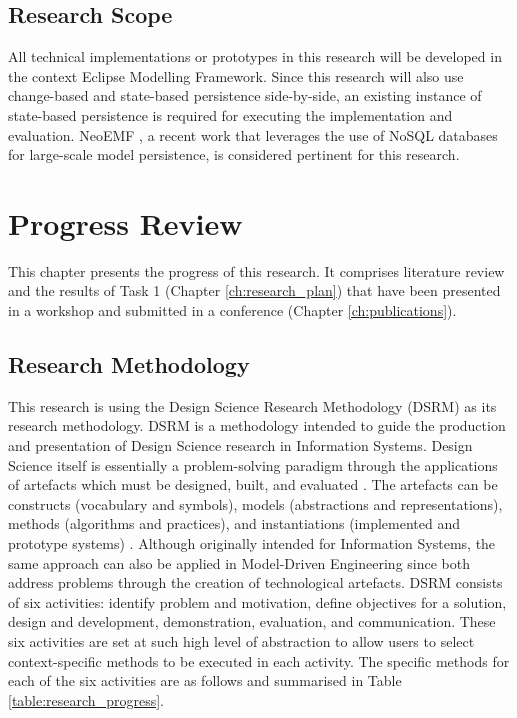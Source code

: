 \documentclass[12pt, a4paper]{report} \usepackage[titletoc]{appendix}
\begin{document}
\section{Research Scope}
\label{sec:research_scope}
All technical implementations or prototypes in this research will be developed in the context Eclipse Modelling Framework. Since this research will also use change-based and state-based persistence side-by-side, an existing instance of state-based persistence is required for executing the implementation and evaluation. NeoEMF \cite{daniel2016neoemf}, a recent work that leverages the use of NoSQL databases for large-scale model persistence, is considered pertinent for this research. 

\chapter{Progress Review}
\label{ch:progress_review}
This chapter presents the progress of this research. It comprises literature review and the results of Task 1 (Chapter \ref{ch:research_plan}) that have been presented in a workshop and submitted in a conference (Chapter \ref{ch:publications}). 

\section{Research Methodology}
\label{sec:research_methodology}
This research is using the Design Science Research Methodology (DSRM) \cite{peffers2007design} as its research methodology. DSRM is a methodology intended to guide the production and presentation of Design Science research in Information Systems. Design Science itself is essentially a problem-solving paradigm through the applications of artefacts which must be designed, built, and evaluated \cite{hevner2010design}. The artefacts can be constructs (vocabulary and symbols), models (abstractions and representations), methods (algorithms and practices), and instantiations (implemented and prototype systems) \cite{hevner2004design}. Although originally intended for Information Systems, the same approach can also be applied in Model-Driven Engineering since both address problems through the creation of technological artefacts. DSRM consists of six activities: identify problem and motivation, define objectives for a solution, design and development, demonstration, evaluation, and communication. These six activities are set at such high level of abstraction to allow users to select context-specific methods to be executed in each activity. The specific methods for each of the six activities are as follows and summarised in Table \ref{table:research_progress}.
\end{document}
